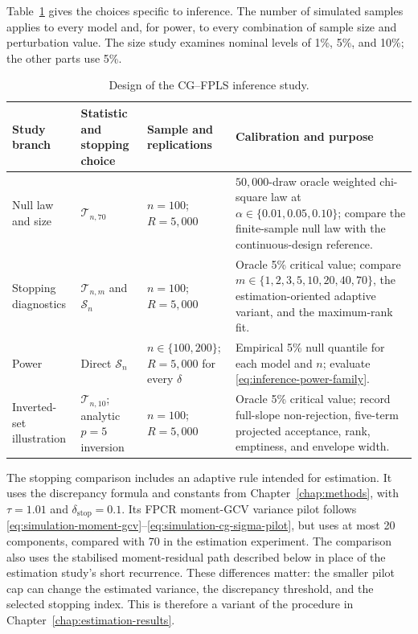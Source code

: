 Table~\ref{tab:inference-design} gives the choices specific to inference.
The number of simulated samples applies to every model and, for power, to
every combination of sample size and perturbation value.  The size study examines
nominal levels of 1\%, 5\%, and 10\%; the other parts use 5\%.

\begin{table}[htbp]
    \centering
    \caption[Inference-study design]{Design of the CG--FPLS inference study.}
    \label{tab:inference-design}
    \small
    \begin{tabular}{@{}
        >{\raggedright\arraybackslash}p{2.75cm}
        >{\raggedright\arraybackslash}p{2.75cm}
        >{\raggedright\arraybackslash}p{3.1cm}
        >{\raggedright\arraybackslash}p{5.25cm}@{}}
        \toprule
        Study branch & Statistic and stopping choice & Sample and replications & Calibration and purpose \\
        \midrule
        Null law and size
        & $\mathcal T_{n,70}$
        & $n=100$; $R=5{,}000$
        & $50{,}000$-draw oracle weighted chi-square law at
          $\alpha\in\{0.01,0.05,0.10\}$; compare the finite-sample null law
          with the continuous-design reference. \\
        Stopping diagnostics
        & $\mathcal T_{n,m}$ and $\mathcal S_n$
        & $n=100$; $R=5{,}000$
        & Oracle 5\% critical value; compare
          $m\in\{1,2,3,5,10,20,40,70\}$, the estimation-oriented adaptive
          variant, and the maximum-rank fit. \\
        Power
        & Direct $\mathcal S_n$
        & $n\in\{100,200\}$; $R=5{,}000$ for every $\delta$
        & Empirical 5\% null quantile for each model and $n$; evaluate
          \eqref{eq:inference-power-family}. \\
        Inverted-set illustration
        & $\mathcal T_{n,10}$; analytic $p=5$ inversion
        & $n=100$; $R=5{,}000$
        & Oracle 5\% critical value; record full-slope non-rejection,
          five-term projected acceptance, rank, emptiness, and envelope width. \\
        \bottomrule
    \end{tabular}
\end{table}

The stopping comparison includes an adaptive rule intended for estimation.
It uses the discrepancy formula and constants from
Chapter~\ref{chap:methods}, with $\tau=1.01$ and
$\delta_{\mathrm{stop}}=0.1$.  Its FPCR moment-GCV variance pilot follows
\eqref{eq:simulation-moment-gcv}--\eqref{eq:simulation-cg-sigma-pilot}, but
uses at most 20 components, compared with 70 in the estimation experiment.
The comparison also uses the stabilised moment-residual path described below
in place of the estimation study's short recurrence.  These differences
matter: the smaller pilot cap can change the estimated variance, the
discrepancy threshold, and the selected stopping index.  This is therefore a
variant of the procedure in Chapter~\ref{chap:estimation-results}.

